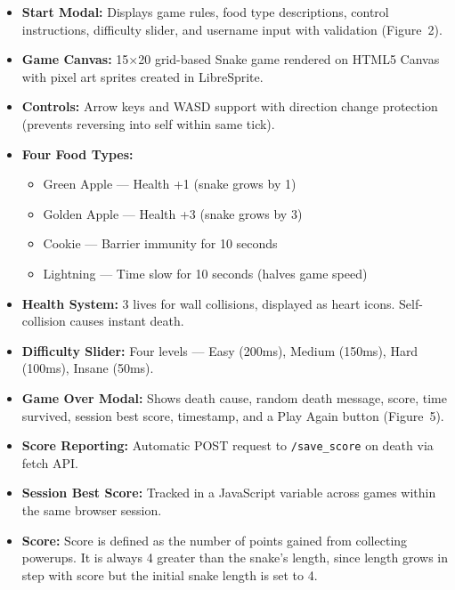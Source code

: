 \documentclass[12pt,a4paper]{article}
\begin{document}
\begin{itemize}
    \item \textbf{Start Modal:} Displays game rules, food type descriptions, control instructions, difficulty slider, and username input with validation (Figure~2).

    \item \textbf{Game Canvas:} 15$\times$20 grid-based Snake game rendered on HTML5 Canvas with pixel art sprites created in LibreSprite.

    \item \textbf{Controls:} Arrow keys and WASD support with direction change protection (prevents reversing into self within same tick).

    \item \textbf{Four Food Types:}
    \begin{itemize}
        \item Green Apple --- Health +1 (snake grows by 1)
        \item Golden Apple --- Health +3 (snake grows by 3)
        \item Cookie --- Barrier immunity for 10 seconds
        \item Lightning --- Time slow for 10 seconds (halves game speed)
    \end{itemize}

    \item \textbf{Health System:} 3 lives for wall collisions, displayed as heart icons. Self-collision causes instant death.

    \item \textbf{Difficulty Slider:} Four levels --- Easy (200ms), Medium (150ms), Hard (100ms), Insane (50ms).

    \item \textbf{Game Over Modal:} Shows death cause, random death message, score, time survived, session best score, timestamp, and a Play Again button (Figure~5).

    \item \textbf{Score Reporting:} Automatic POST request to \texttt{/save\_score} on death via fetch API.

    \item \textbf{Session Best Score:} Tracked in a JavaScript variable across games within the same browser session.

    \item \textbf{Score:} Score is defined as the number of points gained from collecting powerups. It is always 4 greater than the snake's length, since length grows in step with score but the initial snake length is set to 4.


\end{itemize}
\end{document}
